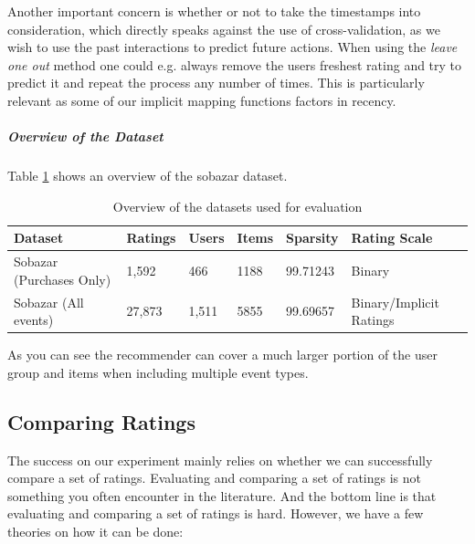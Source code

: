Another important concern is whether or not to take the timestamps into consideration,
which directly speaks against the use of cross-validation, as we wish to use the past
interactions to predict future actions. When using the \emph{leave one out} method one
could e.g. always remove the users freshest rating and try to predict it and repeat the
process any number of times. This is particularly relevant as some of our implicit mapping functions
factors in recency.

\subparagraph{Overview of the Dataset}

Table \ref{table:datasets} shows an overview of the sobazar dataset.


\begin{table}[H]
    \centering
    \begin{tabular}{l l l l l l }
    \toprule
	Dataset						& 	Ratings		& 	Users		& 	Items 		& 	Sparsity			& Rating Scale 				    \\ \midrule
	Sobazar	(Purchases Only) 	&	1,592		&	466			&	1188		&	99.71243			& Binary						\\
	Sobazar (All events)		& 	27,873  	& 	1,511		&	5855		& 	99.69657			& Binary/Implicit Ratings		\\ 
	\bottomrule
    \end{tabular}
    \caption [Overview of the datasets used for evaluation]{Overview of the datasets used for evaluation}
    \label{table:datasets}
\end{table}

As you can see the recommender can cover a much larger portion of the user group and items when including multiple event types.

\subsection{Comparing Ratings}

The success on our experiment mainly relies on whether we can successfully compare a set of ratings.
Evaluating and comparing a set of ratings is not something you often encounter in the literature. And the
bottom line is that evaluating and comparing a set of ratings is hard. However, we have a few theories on
how it can be done:

